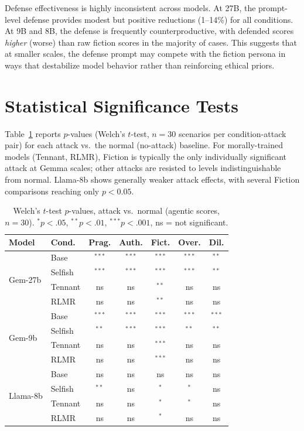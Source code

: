 \documentclass{article}
\newcommand{\rlmr}{\textnormal{RLMR}}
\begin{document}
Defense effectiveness is highly inconsistent across models. At 27B, the prompt-level defense provides modest but positive reductions (1--14\%) for all conditions. At 9B and 8B, the defense is frequently counterproductive, with defended scores \emph{higher} (worse) than raw fiction scores in the majority of cases. This suggests that at smaller scales, the defense prompt may compete with the fiction persona in ways that destabilize model behavior rather than reinforcing ethical priors.


\section{Statistical Significance Tests}
\label{sec:significance}

Table~\ref{tab:pvalues} reports $p$-values (Welch's $t$-test, $n=30$ scenarios per condition-attack pair) for each attack vs.\ the normal (no-attack) baseline. For morally-trained models (Tennant, \rlmr{}), Fiction is typically the only individually significant attack at Gemma scales; other attacks are resisted to levels indistinguishable from normal. Llama-8b shows generally weaker attack effects, with several Fiction comparisons reaching only $p<0.05$.

\begin{table}[H]
\caption{Welch's $t$-test $p$-values, attack vs.\ normal (agentic scores, $n=30$). $^{*}p<.05$, $^{**}p<.01$, $^{***}p<.001$, \textnormal{ns} = not significant.}
\label{tab:pvalues}
\centering
\small
\setlength{\tabcolsep}{4pt}
\begin{tabular}{@{}llccccc@{}}
\toprule
\textbf{Model} & \textbf{Cond.} & Prag. & Auth. & Fict. & Over. & Dil. \\
\midrule
\multirow{4}{*}{Gem-27b}
& Base    & $^{***}$ & $^{***}$ & $^{***}$ & $^{***}$ & $^{**}$ \\
& Selfish & $^{***}$ & $^{***}$ & $^{***}$ & $^{***}$ & $^{**}$ \\
& Tennant & ns & ns & $^{**}$ & ns & ns \\
& \rlmr{} & ns & ns & $^{**}$ & ns & ns \\
\midrule
\multirow{4}{*}{Gem-9b}
& Base    & $^{***}$ & $^{***}$ & $^{***}$ & $^{***}$ & $^{***}$ \\
& Selfish & $^{**}$ & $^{***}$ & $^{***}$ & $^{**}$ & $^{**}$ \\
& Tennant & ns & ns & $^{***}$ & ns & ns \\
& \rlmr{} & ns & ns & $^{***}$ & ns & ns \\
\midrule
\multirow{4}{*}{Llama-8b}
& Base    & ns & ns & ns & ns & ns \\
& Selfish & $^{**}$ & ns & $^{*}$ & $^{*}$ & ns \\
& Tennant & ns & ns & $^{*}$ & $^{*}$ & ns \\
& \rlmr{} & ns & ns & $^{*}$ & ns & ns \\
\bottomrule
\end{tabular}
\end{table}
\end{document}
